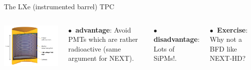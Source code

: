 \documentclass [aspectratio=169]{beamer}
\begin{document}
\begin{frame}{The LXe (instrumented barrel) TPC}
\begin{columns}
\includegraphics[scale=0.6]{nexosketch.png}

$\bullet~$ {\bf advantage}: Avoid PMTs which are rather radioactive (same argument for NEXT). 

$\bullet~$ {\bf disadvantage}: Lots of SiPMs!. 

$\bullet~$ {\bf Exercise}: Why not a BFD like NEXT-HD?  
\end{columns}
\end{frame}
\end{document}

